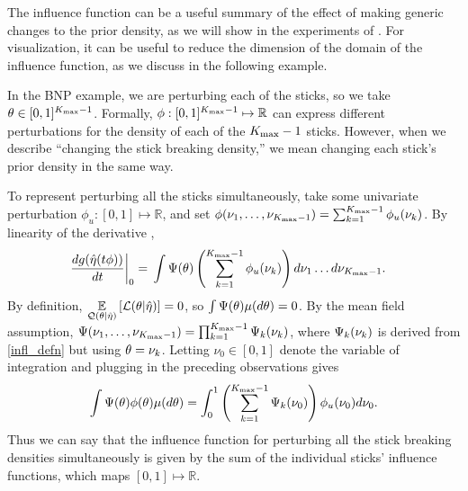 
The influence function can be a useful summary of the effect of making generic
changes to the prior density, as we will show in the experiments of
.  For visualization, it can be useful to reduce the dimension
of the domain of the influence function, as we discuss in the following example.

\begin{ex}
%
In the BNP example, we are perturbing each of the sticks, so we take $\theta \in
[0,1]^{{K_{\mathrm{max}}} - 1}$.  Formally, $\phi: [0,1]^{{K_{\mathrm{max}}} - 1} \mapsto \mathbb{R}$ can
express different perturbations for the density of each of the ${K_{\mathrm{max}}} - 1$
sticks.  However, when we describe ``changing the stick breaking density,'' we
mean changing each stick's prior density in the same way.

To represent perturbing all the sticks simultaneously, take some univariate
perturbation $\phi_{u}: [0,1] \mapsto \mathbb{R}$, and set $\phi(\nu_1, \ldots,
\nu_{{K_{\mathrm{max}}} - 1}) = \sum_{k=1}^{{K_{\mathrm{max}}} - 1} \phi_{u}(\nu_{k})$. By linearity of the
derivative ,
%
\begin{align*}
%
\fracat{d g(\etaopt(\t \phi))}{d \t}{0} ={}&
    \int \infl(\theta) \left(
        \sum_{\k=1}^{\kmax - 1} \phi_{u}(\nuk) \right)
    d\nu_1 \ldots d \nu_{\kmax - 1}.
%
\end{align*}
%
By definition, $\underset{\mathcal{Q}(\theta \vert \hat\eta)}{\mathbb{E}}\left[\mathcal{L}({\theta \vert
\hat\eta})\right] = 0$, so $\int \Psi(\theta) \mu(d\theta) = 0$.  By the mean field
assumption, $\Psi(\nu_1, \ldots, \nu_{{K_{\mathrm{max}}} - 1}) = \prod_{k=1}^{{K_{\mathrm{max}}} - 1}
\Psi_k(\nu_{k})$, where $\Psi_k(\nu_{k})$ is derived from \eqref{infl_defn} but
using $\theta = \nu_{k}$.  Letting $\nu_0 \in [0,1]$ denote the variable of
integration and plugging in the preceding observations gives
%
\begin{align*}
%
\int \infl(\theta) \phi(\theta) \mu(d\theta) =
    \int_0^1 \left(\sum_{\k=1}^{\kmax - 1} \infl_k(\nu_0) \right)
        \phi_{u}(\nu_0) d \nu_0.
%
\end{align*}
%
Thus we can say that the influence function for perturbing all the stick
breaking densities simultaneously is given by the sum of the
individual sticks' influence functions, which maps $[0,1] \mapsto \mathbb{R}$.
%
\end{ex}
